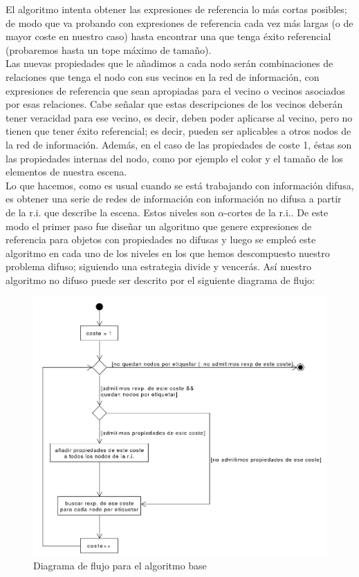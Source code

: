 \documentclass[10pt,a4paper]{article}
\begin{document}
El algoritmo intenta obtener las expresiones de referencia lo más cortas posibles; de modo que va probando con expresiones de referencia cada vez más largas (o de mayor coste en nuestro caso) hasta encontrar una que tenga éxito referencial (probaremos hasta un tope máximo de tamaño).\\

Las nuevas propiedades que le añadimos a cada nodo serán combinaciones de relaciones que tenga el nodo con sus vecinos en la red de información, con expresiones de referencia que sean apropiadas para el vecino o vecinos asociados por esas relaciones. Cabe señalar que estas descripciones de los vecinos deberán tener veracidad para ese vecino, es decir, deben poder aplicarse al vecino, pero no tienen que tener éxito referencial; es decir, pueden ser aplicables a otros nodos de la red de información. Además, en el caso de las propiedades de coste 1, éstas son las propiedades internas del nodo, como por ejemplo el color y el tamaño de los elementos de nuestra escena.\\

Lo que hacemos, como es usual cuando se está trabajando con información difusa, es obtener una serie de redes de información con información no difusa a partir de la r.i. que describe la escena. Estos niveles son $\alpha$-cortes de la r.i.. De este modo el primer paso fue diseñar un algoritmo que genere expresiones de referencia para objetos con propiedades no difusas y luego se empleó este algoritmo en cada uno de los niveles en los que hemos descompuesto nuestro problema difuso; siguiendo una estrategia divide y vencerás. Así nuestro algoritmo no difuso puede ser descrito por el siguiente diagrama de flujo:

\begin{figure}[h]
\centering
\includegraphics[scale=0.5]{img/diagramaFlujoAlgCrisp.png}
\caption{Diagrama de flujo para el algoritmo base}
\end{figure}
\end{document}
